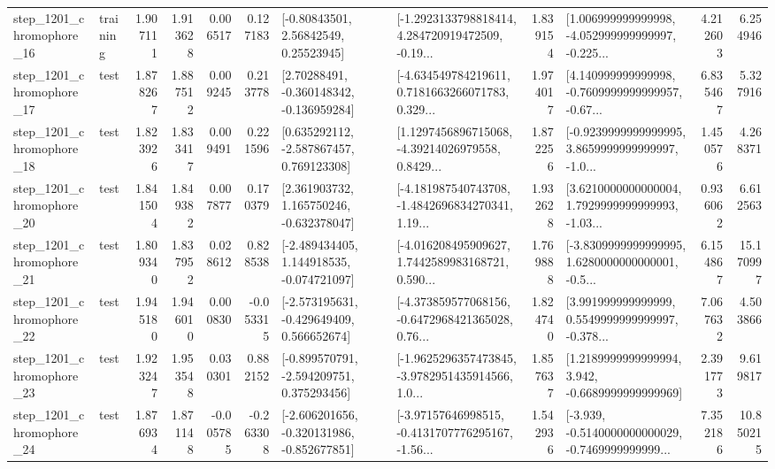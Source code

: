 \begin{tabular}{llrrrrllrlrr}
 step\_1201\_chromophore\_16 &  training &      1.907111 &    1.913628 &      0.006517 &  0.127183 &       [-0.80843501, 2.56842549, 0.25523945] &  [-1.2923133798818414, 4.284720919472509, -0.19... &       1.839154 &  [1.006999999999998, -4.052999999999997, -0.225... &            4.212603 &          6.254946 \\
 step\_1201\_chromophore\_17 &      test &      1.878267 &    1.887512 &      0.009245 &  0.213778 &    [2.70288491, -0.360148342, -0.136959284] &  [-4.634549784219611, 0.7181663266071783, 0.329... &       1.974017 &  [4.140999999999998, -0.7609999999999957, -0.67... &            6.835467 &          5.327916 \\
 step\_1201\_chromophore\_18 &      test &      1.823926 &    1.833417 &      0.009491 &  0.221596 &    [0.635292112, -2.587867457, 0.769123308] &  [1.1297456896715068, -4.39214026979558, 0.8429... &       1.872256 &  [-0.9239999999999995, 3.8659999999999997, -1.0... &            1.450576 &          4.268371 \\
 step\_1201\_chromophore\_20 &      test &      1.841504 &    1.849382 &      0.007877 &  0.170379 &    [2.361903732, 1.165750246, -0.632378047] &  [-4.181987540743708, -1.4842696834270341, 1.19... &       1.932628 &  [3.6210000000000004, 1.7929999999999993, -1.03... &            0.936062 &          6.612563 \\
 step\_1201\_chromophore\_21 &      test &      1.809340 &    1.837952 &      0.028612 &  0.828538 &   [-2.489434405, 1.144918535, -0.074721097] &  [-4.016208495909627, 1.7442589983168721, 0.590... &       1.769888 &  [-3.8309999999999995, 1.6280000000000001, -0.5... &            6.154867 &         15.170997 \\
 step\_1201\_chromophore\_22 &      test &      1.945180 &    1.946010 &      0.000830 & -0.053315 &   [-2.573195631, -0.429649409, 0.566652674] &  [-4.373859577068156, -0.6472968421365028, 0.76... &       1.824740 &  [3.991999999999999, 0.5549999999999997, -0.378... &            7.067632 &          4.503866 \\
 step\_1201\_chromophore\_23 &      test &      1.923247 &    1.953548 &      0.030301 &  0.882152 &   [-0.899570791, -2.594209751, 0.375293456] &  [-1.9625296357473845, -3.9782951435914566, 1.0... &       1.857637 &   [1.2189999999999994, 3.942, -0.6689999999999969] &            2.391773 &          9.619817 \\
 step\_1201\_chromophore\_24 &      test &      1.876934 &    1.871148 &     -0.005785 & -0.263308 &  [-2.606201656, -0.320131986, -0.852677851] &  [-3.97157646998515, -0.4131707776295167, -1.56... &       1.542936 &  [-3.939, -0.5140000000000029, -0.7469999999999... &            7.352186 &         10.850215 \\

\end{tabular}
